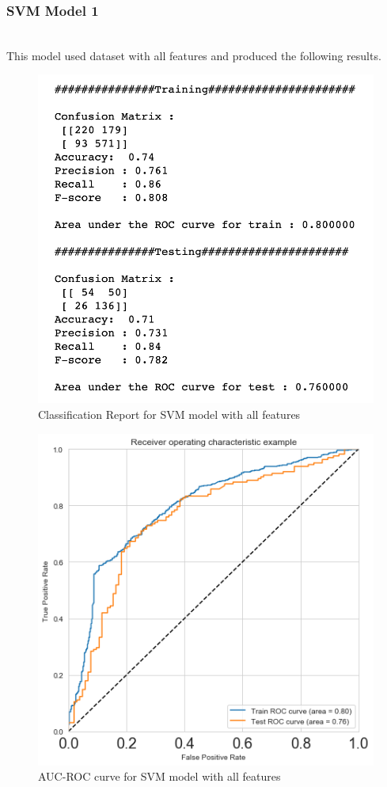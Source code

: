 \documentclass[format=sigconf]{acmart}
\begin{document}
\subsubsection{SVM Model 1}
\hfill\\
This model used dataset with all features and produced the following results.
\begin{figure}[H]
    \centering
    \includegraphics[scale=0.50]{SVM_Model_1_results.png}
    \caption{Classification Report for SVM model with all features}
    \label{fig:svmmodel1}
\end{figure}

\begin{figure}[H]
    \centering
    \includegraphics[scale=0.50]{AUC_ROC_SVM_Model_1.png}
    \caption{AUC-ROC curve for SVM model with all features}
    \label{fig:aucrocmodel1}
\end{figure}
\end{document}
